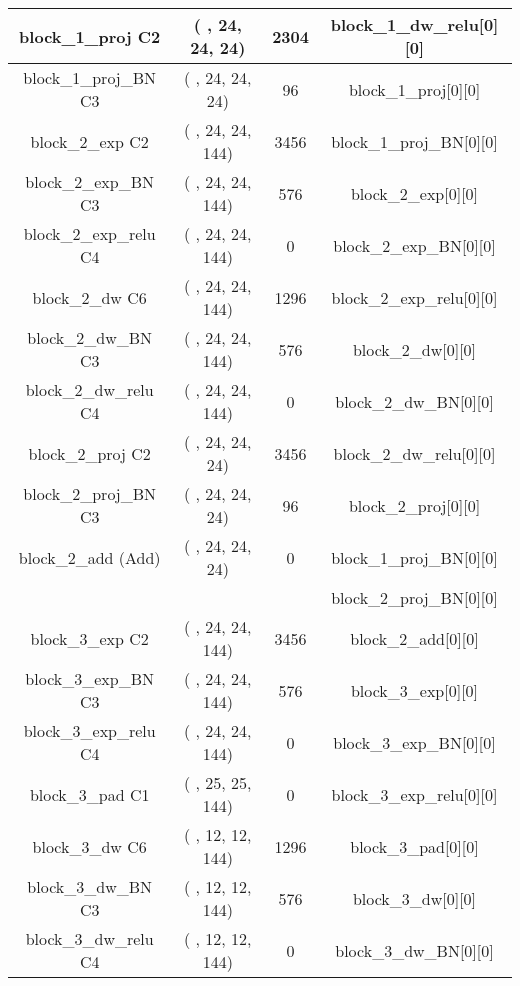 \documentclass{bmvc2k}
\begin{document}
\begin{table}
\begin{tabular}{|c|c|c|c|}
block\_1\_proj C2        & ( , 24, 24, 24) &  2304   &     block\_1\_dw\_relu[0][0]     \\ \hline
block\_1\_proj\_BN C3 & ( , 24, 24, 24) &  96     &     block\_1\_proj[0][0]            \\ \hline
block\_2\_exp C2         & ( , 24, 24, 144)&  3456   &     block\_1\_proj\_BN[0][0]         \\ \hline
block\_2\_exp\_BN C3 & ( , 24, 24, 144)&  576    &     block\_2\_exp[0][0]             \\ \hline
block\_2\_exp\_relu C4      & ( , 24, 24, 144)&  0      &     block\_2\_exp\_BN[0][0]          \\ \hline
block\_2\_dw C6 & ( , 24, 24, 144)&  1296   &     block\_2\_exp\_relu[0][0]        \\ \hline
block\_2\_dw\_BN C3 & ( , 24, 24, 144)&  576    &     block\_2\_dw[0][0]          \\ \hline
block\_2\_dw\_relu C4   & ( , 24, 24, 144)&  0      &     block\_2\_dw\_BN[0][0]       \\ \hline
block\_2\_proj C2        & ( , 24, 24, 24) &  3456   &     block\_2\_dw\_relu[0][0]     \\ \hline
block\_2\_proj\_BN C3 & ( , 24, 24, 24) &  96     &     block\_2\_proj[0][0]            \\ \hline
block\_2\_add (Add)               & ( , 24, 24, 24) &  0      &     block\_1\_proj\_BN[0][0]         \\ 
                                &                    &         &    block\_2\_proj\_BN[0][0]         \\ \hline
block\_3\_exp C2         & ( , 24, 24, 144)&  3456   &     block\_2\_add[0][0]                \\ \hline
block\_3\_exp\_BN C3 & ( , 24, 24, 144)&  576    &     block\_3\_exp[0][0]             \\ \hline
block\_3\_exp\_relu C4      & ( , 24, 24, 144)&  0      &     block\_3\_exp\_BN[0][0]          \\ \hline
block\_3\_pad C1     & ( , 25, 25, 144)&  0      &     block\_3\_exp\_relu[0][0]        \\ \hline
block\_3\_dw C6 & ( , 12, 12, 144)&  1296   &     block\_3\_pad[0][0]                \\ \hline
block\_3\_dw\_BN C3 & ( , 12, 12, 144)&  576    &     block\_3\_dw[0][0]          \\ \hline
block\_3\_dw\_relu C4   & ( , 12, 12, 144)&  0      &     block\_3\_dw\_BN[0][0]       \\ \hline

\end{tabular}
\end{table}
\end{document}
